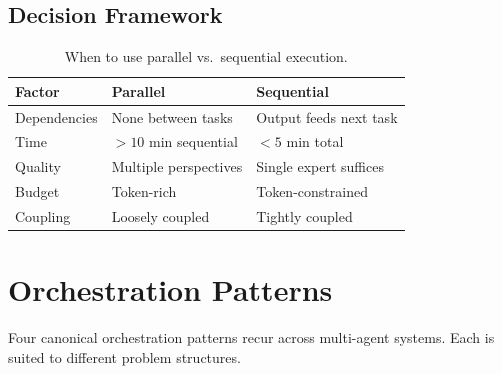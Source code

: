 \documentclass[11pt,letterpaper,twocolumn]{article}
\begin{document}
\subsection{Decision Framework}

\begin{table}[H]
\centering
\caption{When to use parallel vs.\ sequential execution.}
\label{tab:parallel-decision}
\small
\begin{tabularx}{\columnwidth}{@{}lXX@{}}
\toprule
\textbf{Factor} & \textbf{Parallel} & \textbf{Sequential} \\
\midrule
Dependencies   & None between tasks    & Output feeds next task \\
Time           & $> 10$ min sequential & $< 5$ min total \\
Quality        & Multiple perspectives & Single expert suffices \\
Budget         & Token-rich            & Token-constrained \\
Coupling       & Loosely coupled       & Tightly coupled \\
\bottomrule
\end{tabularx}
\end{table}

\section{Orchestration Patterns}
\label{sec:orchestration}

Four canonical orchestration patterns recur across multi-agent systems.  Each
is suited to different problem structures.
\end{document}
